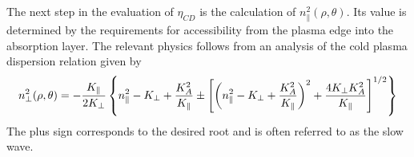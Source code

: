 The next step in the evaluation of $\eta_{CD}$ is the calculation of $n_\parallel^2(\rho,\theta)$. Its value is determined by the requirements for accessibility from the plasma edge into the absorption layer. The relevant physics follows from an analysis of the cold plasma dispersion relation given by
\begin{equation}
\small
\label{eq:lhcd_4}
n _ { \perp } ^ { 2 } ( \rho , \theta ) = - \frac { K _ { \| } } { 2 K _ { \perp } } \left\{ n _ { \| } ^ { 2 } - K _ { \perp } + \frac { K _ { A } ^ { 2 } } { K _ { \| } } \pm \left[ \left( n _ { \| } ^ { 2 } - K _ { \perp } + \frac { K _ { A } ^ { 2 } } { K _ { \| } } \right) ^ { 2 } + \frac { 4 K _ { \perp } K _ { A } ^ { 2 } } { K _ { \| } } \right] ^ { 1 / 2 } \right\}	
\end{equation}
The plus sign corresponds to the desired root and is often referred to as the slow wave.

